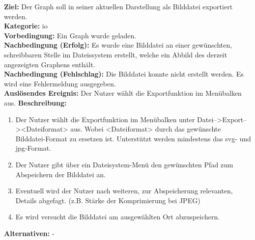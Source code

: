 \label{fa:export_img}
\textbf{Ziel:} Der Graph soll in seiner aktuellen Darstellung als Bilddatei exportiert werden. \\
\textbf{Kategorie:} \gls{io} \\
\textbf{Vorbedingung:} Ein Graph wurde geladen.  \\
\textbf{Nachbedingung (Erfolg):} Es wurde eine Bilddatei an einer gewünschten, schreibbaren Stelle im Dateissystem erstellt, welche ein Abbild des derzeit angezeigten Graphens enthält. \\
\textbf{Nachbedingung (Fehlschlag):} Die Bilddatei konnte nicht erstellt werden. Es wird eine Fehlermeldung ausgegeben. \\
\textbf{Auslösendes Ereignis:}
Der Nutzer wählt die Exportfunktion im Menübalken aus.
\textbf{Beschreibung:}
\begin{enumerate}[nolistsep]
  \item Der Nutzer wählt die Exportfunktion im Menübalken unter Datei-->Export--><Dateiformat> aus. Wobei <Dateiformat> durch das gewünschte Bilddatei-Format zu ersetzen ist. Unterstützt werden mindestens das \gls{svg}- und \gls{jpg}-Format. %
  \item Der Nutzer gibt über ein Dateisystem-Menü den gewünschten Pfad zum Abspeichern der Bilddatei an.
  \item Eventuell wird der Nutzer nach weiteren, zur Abspeicherung relevanten, Details abgefagt. (z.B. Stärke der Komprimierung bei JPEG)
  \item Es wird versucht die Bilddatei am ausgewählten Ort abzuspeichern.
\end{enumerate}
\textbf{Alternativen:} -

